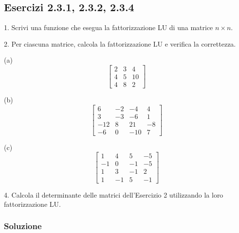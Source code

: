 \documentclass[letterpaper, 12pt]{article}
\begin{document}
\subsection{Esercizi 2.3.1, 2.3.2, 2.3.4}
1. Scrivi una funzione che esegua la fattorizzazione LU di una matrice $n\times n$.

2. Per ciascuna matrice, calcola la fattorizzazione LU e verifica la correttezza.

    \begin{center}
    \begin{minipage}{0.32\textwidth}
    \centering
    (a)
    \[
    \begin{bmatrix}
    2 & 3 & 4 \\
    4 & 5 & 10 \\
    4 & 8 & 2
    \end{bmatrix}
    \]
    \end{minipage}
    \hfill
    \begin{minipage}{0.32\textwidth}
    \centering
    (b)
    \[
    \begin{bmatrix}
    6 & -2 & -4 & 4\\
    3 & -3 & -6 & 1 \\
    -12 & 8 & 21 & -8 \\
    -6 & 0 & -10 & 7
    \end{bmatrix}
    \]
    \end{minipage}
    \hfill
    \begin{minipage}{0.32\textwidth}
    \centering
    (c)
    \[
    \begin{bmatrix}
    1 & 4 & 5 & -5 \\
    -1 & 0 & -1 & -5 \\
    1 & 3 & -1 & 2 \\
    1 & -1 & 5 & -1 
    \end{bmatrix}
    \]
    \end{minipage}
    \end{center}

4. Calcola il determinante delle matrici dell'Esercizio 2 utilizzando la loro fattorizzazione LU.

\subsubsection{Soluzione}
\end{document}
